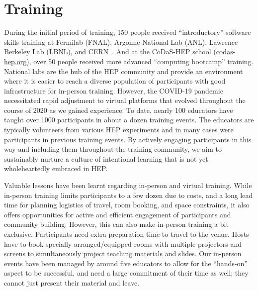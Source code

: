 \documentclass[twocolumn]{svjour3}          %
\begin{document}
\section{Training}\label{sec:Training}

During the initial period of training, 150 people received ``introductory'' software skills training at Fermilab (FNAL), Argonne National Lab (ANL), Lawrence Berkeley Lab (LBNL), and CERN~\cite{HSF-training-SC-FNAL-2019,HSF-training-ATLAS-ANL-2019,HSF-training-ATLAS-LBNL-2019,HSF-training-SC-CERN-2019}. And at the CoDaS-HEP school (\href{http://codas-hep.org/}{codas-hep.org}), over 50 people received more advanced ``computing bootcamp'' training. National labs are the hub of the HEP community and provide an environment where it is easier to reach a diverse population of participants with good infrastructure for in-person training.  However, the COVID-19 pandemic necessitated rapid adjustment to virtual platforms that evolved throughout the course of 2020 as we gained experience.  To date, nearly 100 educators have taught over 1000 participants in about a dozen training events. The educators are typically volunteers from various HEP experiments and in many cases were participants in previous training events.  By actively engaging participants in this way and including them throughout the training community, we aim to sustainably nurture a culture of intentional learning that is not yet wholeheartedly embraced in HEP. 

Valuable lessons have been learnt regarding in-person and virtual training. While in-person training limits participants to a few dozen due to costs, and a long lead time for planning logistics of travel, room booking, and space constraints, it also offers opportunities for active and efficient engagement of participants and community building. However, this can also make in-person training a bit exclusive. Participants need extra preparation time to travel to the venue. Hosts have to book specially arranged/equipped rooms with multiple projectors and screens to simultaneously project teaching materials and slides. Our in-person events have been managed by around five educators to allow for the ``hands-on'' aspect to be successful, and need a large commitment of their time as well; they cannot just present their material and leave.
\end{document}
